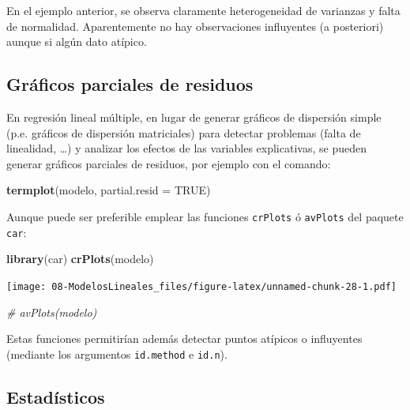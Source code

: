 \documentclass[]{book}
\newenvironment{Shaded}{\begin{snugshade}}{\end{snugshade}}
\newcommand{\CommentTok}[1]{\textcolor[rgb]{0.56,0.35,0.01}{\textit{#1}}}
\newcommand{\DataTypeTok}[1]{\textcolor[rgb]{0.13,0.29,0.53}{#1}}
\newcommand{\KeywordTok}[1]{\textcolor[rgb]{0.13,0.29,0.53}{\textbf{#1}}}
\newcommand{\NormalTok}[1]{#1}
\newcommand{\OtherTok}[1]{\textcolor[rgb]{0.56,0.35,0.01}{#1}}
\begin{document}
En el ejemplo anterior, se observa claramente heterogeneidad de varianzas y falta de normalidad. Aparentemente no hay observaciones influyentes (a posteriori) aunque si algún dato atípico.

\hypertarget{graficos-parciales-de-residuos}{%
\subsection{Gráficos parciales de residuos}\label{graficos-parciales-de-residuos}}

En regresión lineal múltiple, en lugar de generar gráficos de dispersión simple
(p.e. gráficos de dispersión matriciales) para detectar problemas (falta de
linealidad, \ldots{}) y analizar los efectos de las variables explicativas,
se pueden generar gráficos parciales de residuos, por ejemplo con el comando:

\begin{Shaded}
\begin{Highlighting}[]
\KeywordTok{termplot}\NormalTok{(modelo, }\DataTypeTok{partial.resid =} \OtherTok{TRUE}\NormalTok{)}
\end{Highlighting}
\end{Shaded}

Aunque puede ser preferible emplear las funciones \texttt{crPlots} ó \texttt{avPlots} del paquete \texttt{car}:

\begin{Shaded}
\begin{Highlighting}[]
\KeywordTok{library}\NormalTok{(car)}
\KeywordTok{crPlots}\NormalTok{(modelo)}
\end{Highlighting}
\end{Shaded}

\texttt{[image: 08-ModelosLineales\_files/figure-latex/unnamed-chunk-28-1.pdf]}

\begin{Shaded}
\begin{Highlighting}[]
\CommentTok{# avPlots(modelo)}
\end{Highlighting}
\end{Shaded}

Estas funciones permitirían además detectar puntos atípicos o influyentes
(mediante los argumentos \texttt{id.method} e \texttt{id.n}).

\hypertarget{estadisticos}{%
\subsection{Estadísticos}\label{estadisticos}}
\end{document}
